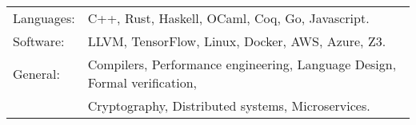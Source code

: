 \begin{tabular}{l l}
  Languages: & C++, Rust, Haskell, OCaml, Coq, Go, Javascript. \\
  Software: & LLVM, TensorFlow, Linux, Docker, AWS, Azure, Z3. \\
  General: & Compilers, Performance engineering, Language Design, Formal verification,\\
         & Cryptography, Distributed systems, Microservices. \\
\end{tabular}


